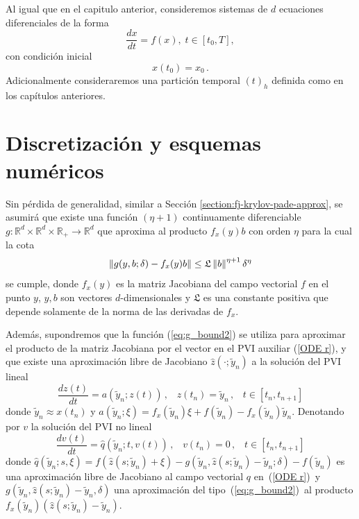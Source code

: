 Al igual que en el capitulo anterior, consideremos sistemas de $d$ ecuaciones diferenciales de la forma
\begin{equation}\label{syst-chap-fj}
	\frac{dx}{dt}=f(x), \; t\in[t_0,T],\end{equation}
con condición inicial
\begin{equation}\label{systcond-chap-fj}
	x(t_0)=x_0\,.
\end{equation}
Adicionalmente consideraremos una partición temporal $(t)_h$ definida como en los capítulos anteriores. 

\section{Discretización y esquemas numéricos}

Sin pérdida de generalidad, similar a Sección \ref{section:fj-krylov-pade-approx}, se asumirá que existe una función $(\eta+1)$ continuamente diferenciable $g: \mathbb{R}^{d}\times \mathbb{R}^{d} \times \mathbb{R}_+ \to \mathbb{R}^{d}$ que aproxima al producto $f_x(y)b$ con orden $\eta$ para la cual la cota
\begin{equation} \label{eq:g_bound2}
	\left\lVert g(y,b;\delta)-f_x(y)b \right\rVert \leq \mathfrak{L}\left\lVert b \right\rVert^{\eta+1}\delta^{\eta}
\end{equation}
se cumple, donde $f_x(y)$ es la matriz Jacobiana del campo vectorial $f$ en el punto $y$, $y,b$ son vectores $d$-dimensionales y $\mathfrak{L}$ es una constante positiva que depende solamente de la norma de las derivadas de $f_x$.

Además, supondremos que la función (\ref{eq:g_bound2}) se utiliza para aproximar el producto de la matriz Jacobiana por el vector en el PVI auxiliar (\ref{ODE r}), y que existe una aproximación libre de Jacobiano $\widehat{z}(\cdotp ;\widetilde{y}_n)$ a la solución del PVI lineal
\begin{equation}
    \frac{dz(t)}{dt} = a(\widetilde{y}_n;z(t)) \,,\;\;\; z(t_n)=\widetilde{y}_n \,,\;\;\; t\in[t_n,t_{n+1}]\label{fjsyst0}
\end{equation}
donde $\widetilde{y}_n\approx x(t_n)$ y $a(\widetilde{y}_n;\xi) = f_x(\widetilde{y}_n)\xi+f(\widetilde{y}_n)-f_x(\widetilde{y}_n)\widetilde{y}_n$. Denotando por $v$ la solución del PVI no lineal
\begin{equation}
    \frac{dv(t)}{dt} = \widehat{q}(\widetilde{y}_n;t,v(t)) \,,\;\;\; v(t_n)=0 \,,\;\;\; t\in[t_n,t_{n+1}] \label{fjsyst}
\end{equation}
donde $\widehat{q}(\widetilde{y}_n;s,\xi)=f(\widehat{z}(s;\widetilde{y}_n)+\xi)-g(\widetilde{y}_n,\widehat{z}(s;\widetilde{y}_n)-\widetilde{y}_n;\delta)-f(\widetilde{y}_n)$ es una aproximación libre de Jacobiano al campo vectorial $q$ en~(\ref{ODE r})~y $g(\widetilde{y}_n,\widehat{z}(s;\widetilde{y}_n)-\widetilde{y}_n,\delta)$ una aproximación del tipo~(\ref{eq:g_bound2})~al producto $f_x(\widetilde{y}_n)(\widehat{z}(s;\widetilde{y}_n)-\widetilde{y}_n)$.

